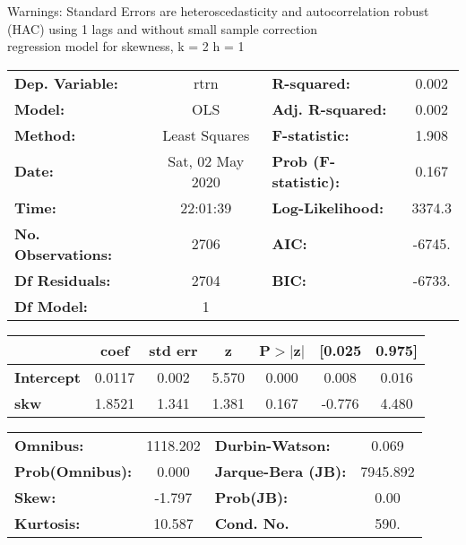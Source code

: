 Warnings: \newline
 [1] Standard Errors are heteroscedasticity and autocorrelation robust (HAC) using 1 lags and without small sample correction\\ 

regression model for skewness, k = 2 h = 1\begin{center}
\begin{tabular}{lclc}
\toprule
\textbf{Dep. Variable:}    &       rtrn       & \textbf{  R-squared:         } &     0.002   \\
\textbf{Model:}            &       OLS        & \textbf{  Adj. R-squared:    } &     0.002   \\
\textbf{Method:}           &  Least Squares   & \textbf{  F-statistic:       } &     1.908   \\
\textbf{Date:}             & Sat, 02 May 2020 & \textbf{  Prob (F-statistic):} &    0.167    \\
\textbf{Time:}             &     22:01:39     & \textbf{  Log-Likelihood:    } &    3374.3   \\
\textbf{No. Observations:} &        2706      & \textbf{  AIC:               } &    -6745.   \\
\textbf{Df Residuals:}     &        2704      & \textbf{  BIC:               } &    -6733.   \\
\textbf{Df Model:}         &           1      & \textbf{                     } &             \\
\bottomrule
\end{tabular}
\begin{tabular}{lcccccc}
                   & \textbf{coef} & \textbf{std err} & \textbf{z} & \textbf{P$> |$z$|$} & \textbf{[0.025} & \textbf{0.975]}  \\
\midrule
\textbf{Intercept} &       0.0117  &        0.002     &     5.570  &         0.000        &        0.008    &        0.016     \\
\textbf{skw}       &       1.8521  &        1.341     &     1.381  &         0.167        &       -0.776    &        4.480     \\
\bottomrule
\end{tabular}
\begin{tabular}{lclc}
\textbf{Omnibus:}       & 1118.202 & \textbf{  Durbin-Watson:     } &    0.069  \\
\textbf{Prob(Omnibus):} &   0.000  & \textbf{  Jarque-Bera (JB):  } & 7945.892  \\
\textbf{Skew:}          &  -1.797  & \textbf{  Prob(JB):          } &     0.00  \\
\textbf{Kurtosis:}      &  10.587  & \textbf{  Cond. No.          } &     590.  \\
\bottomrule
\end{tabular}
\end{center}


